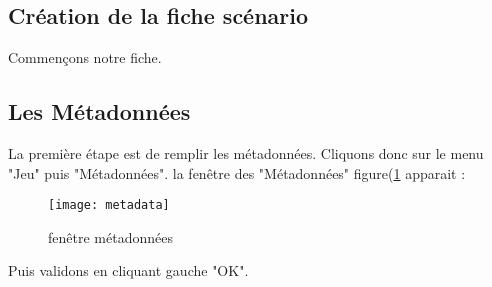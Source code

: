 \documentclass[a4paper,12pt]{article}
\begin{document}
\subsection{Création de la fiche scénario}
Commençons notre fiche.
\subsection{Les Métadonnées}
La première étape est de remplir les métadonnées. Cliquons donc sur le menu "Jeu" puis "Métadonnées".
la fenêtre des "Métadonnées" figure(\ref{metadata} apparait :
\begin{figure}[h!]
    \texttt{[image: metadata]}
    \caption{fenêtre métadonnées}
    \label{metadata}
\end{figure}
Puis validons en cliquant gauche "OK".
\end{document}
